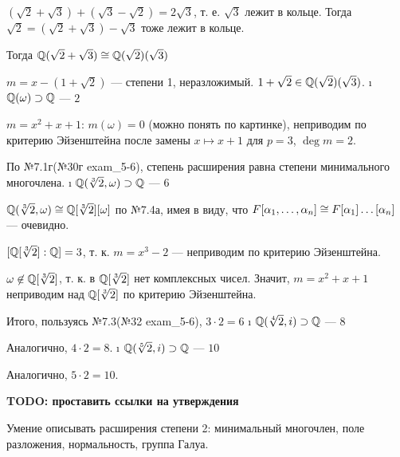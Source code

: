 \begin{solution}
\begin{itemize}
\begin{solution}
	$(\sqrt2+\sqrt3)+(\sqrt3-\sqrt2) = 2\sqrt3$, т. е. $\sqrt3$ лежит в кольце. Тогда $\sqrt2 = (\sqrt2+\sqrt3)-\sqrt3$ тоже лежит в кольце.
  \end{solution}
  
  Тогда $\mathbb{Q}(\sqrt2+\sqrt{3}) \cong \mathbb{Q}(\sqrt2)(\sqrt{3})$
  
  $m = x-(1+\sqrt2)$ --- степени 1, неразложимый. $1+\sqrt2 \in \mathbb{Q}(\sqrt2)(\sqrt{3})$.
\i
  \(\mathbb{Q}(\omega) \supset \mathbb{Q}\) --- \(2\)
  
  $m = x^2+x+1$: $m(\omega) = 0$ (можно понять по картинке), неприводим по критерию Эйзенштейна после замены $x \mapsto x+1$ для $p=3$, $\deg m = 2$.
  
  По №7.1г(№30г exam\_5-6), степень расширения равна степени минимального многочлена.
\i
  \(\mathbb{Q}(\sqrt[3]{2}, \omega) \supset \mathbb{Q}\) --- \(6\)
  
  $\mathbb{Q}(\sqrt[3]{2}, \omega) \cong \mathbb{Q}[\sqrt[3]{2}][\omega]$ по №7.4а, имея в виду, что $F[\alpha_1, \dots, \alpha_n] \cong F[\alpha_1]\dots[\alpha_n]$ --- очевидно.
  
  $[\mathbb{Q}[\sqrt[3]{2}]:\mathbb{Q}] = 3$, т. к. $m = x^3-2$ --- неприводим по критерию Эйзенштейна.
  
  $\omega \not\in \mathbb{Q}[\sqrt[3]{2}]$, т. к. в $\mathbb{Q}[\sqrt[3]{2}]$ нет комплексных чисел. Значит, $m = x^2+x+1$ неприводим над $\mathbb{Q}[\sqrt[3]{2}]$ по критерию Эйзенштейна.
  
  Итого, пользуясь №7.3(№32 exam\_5-6), $3\cdot 2 = 6$
\i
  \(\mathbb{Q}(\sqrt[4]{2}, i) \supset \mathbb{Q}\) --- \(8\)
  
  Аналогично, $4\cdot2 = 8$.
\i
  \(\mathbb{Q}(\sqrt[5]{2}, i) \supset \mathbb{Q}\) --- \(10\)
  
  Аналогично, $5\cdot2 = 10$.
\end{itemize}

\bf{TODO: проставить ссылки на утверждения}
\end{solution}

\begin{problem}[35(6.10,8.9а,9.5)] Умение описывать расширения степени 2: минимальный многочлен, поле разложения, нормальность, группа Галуа.
\end{problem}

